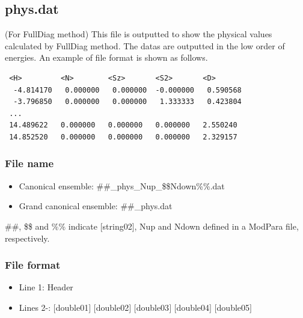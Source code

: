 \subsection{phys.dat}
\label{Subsec:phys}
(For FullDiag method)  This file is outputted to show the physical values calculated by FullDiag method.  The datas are outputted in the low order of energies. An example of file format is shown as follows.\\
\begin{minipage}{12.5cm}
\begin{screen}
\begin{verbatim}
 <H>         <N>        <Sz>       <S2>       <D> 
  -4.814170   0.000000   0.000000  -0.000000   0.590568
  -3.796850   0.000000   0.000000   1.333333   0.423804
 ...
 14.489622   0.000000   0.000000   0.000000   2.550240
 14.852520   0.000000   0.000000   0.000000   2.329157
\end{verbatim}
\end{screen}
\end{minipage}

\subsubsection{File name}
\begin{itemize}
   \item {Canonical ensemble:} \#\#\_phys\_Nup\_\$\$Ndown\%\%.dat
   \item {Grand canonical ensemble:} \#\#\_phys.dat
 \end{itemize}
  \#\#, \$\$ and \%\% indicate [string02], Nup and Ndown defined in a ModPara file, respectively.

\subsubsection{File format}
 \begin{itemize}
   \item Line 1: Header
   \item Lines 2-: $[$double01$]$ $[$double02$]$ $[$double03$]$ $[$double04$]$ $[$double05$]$
  \end{itemize}
